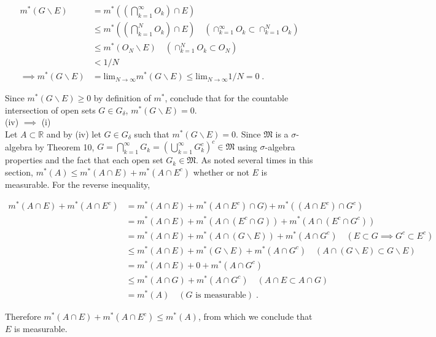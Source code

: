 \documentclass[a4paper]{article}
\begin{document}
\begin{align*}
m^*(G \backslash E) &= m^*\left(\left(\bigcap_{k=1}^\infty O_k \right)\cap E\right)\\
&\leq m^*\left(\left(\bigcap_{k=1}^N O_k \right)\cap E\right) \quad (\cap_{k=1}^\infty O_k \subset \cap_{k=1}^N O_k)\\
&\leq m^*(O_N \backslash E) \quad (\cap_{k=1}^N O_k \subset O_N)\\
&< 1/N\\
\implies m^*(G \backslash E) &= \text{lim}_{N \rightarrow \infty} m^*(G\backslash E) \leq \text{lim}_{N \rightarrow \infty} 1/N = 0 \;.
\end{align*}

Since $m^*(G\backslash E) \geq 0$ by definition of $m^*$, conclude that for the countable intersection of open sets $G \in G_\delta$, $m^*(G \backslash E) = 0$.\\

(iv) $\implies$ (i)\\
Let $A \subset \mathbb{R}$ and by (iv) let $G \in G_\delta$ such that $m^*(G \backslash E) = 0$. Since $\mathfrak{M}$ is a $\sigma$-algebra by Theorem 10, $G = \bigcap_{k=1}^\infty G_k = \left(\bigcup_{k=1}^\infty G_k^c \right)^c \in \mathfrak{M}$ using $\sigma$-algebra properties and the fact that each open set $G_k \in \mathfrak{M}$. As noted several times in this section, $m^*(A) \leq m^*(A \cap E) + m^*(A \cap E^c)$ whether or not $E$ is measurable. For the reverse inequality,

\begin{align*}
m^*(A \cap E) + m^*(A \cap E^c) &= m^*(A\cap E) + m^*(A\cap E^c) \cap G) + m^*((A\cap E^c) \cap G^c) \\
&= m^*(A \cap E) + m^*(A \cap (E^c \cap G)) + m^*(A \cap (E^c \cap G^c))\\
&= m^*(A \cap E) + m^*(A \cap (G\backslash E)) + m^*(A\cap G^c) \quad (E\subset G \implies G^c \subset E^c)\\
&\leq m^*(A \cap E) + m^*(G\backslash E) + m^*(A\cap G^c) \quad (A\cap (G\backslash E) \subset G\backslash E) \\
& = m^*(A \cap E) + 0 + m^*(A\cap G^c) \\
& \leq m^*(A \cap G) + m^*(A\cap G^c) \quad (A\cap E \subset A \cap G)\\
&=m^*(A) \quad (G \text{ is measurable}) \;.
\end{align*}

Therefore $m^*(A\cap E) + m^*(A \cap E^c) \leq m^*(A)$, from which we conclude that $E$ is measurable. \\
\end{document}

